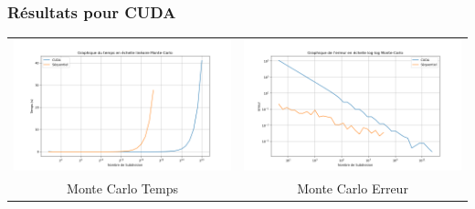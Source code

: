 \documentclass[10pt]{beamer}
\begin{document}
\begin{frame}
    \frametitle{Résultats pour CUDA}
        \small
    \begin{tabular}{cc}
         \includegraphics[width=0.45\linewidth]{../Images/time_monte_carlo_cuda.png} &
         \includegraphics[width=0.45\linewidth]{../Images/error_monte_carlo_cuda.png} \\
        Monte Carlo Temps & Monte Carlo Erreur\\
    \end{tabular}
        
\end{frame}
\end{document}
